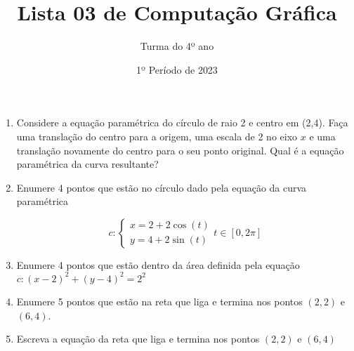 \documentclass[12pt]{article}
\title{Lista 03 de Computação Gráfica}
\date{1º Período de 2023}
\author{Turma do 4º ano}
\begin{document}
\maketitle

\begin{enumerate}


\item Considere a equação paramétrica do círculo de raio 2 e centro em (2,4).
Faça uma translação do centro para a origem, uma escala de 2 no eixo $x$ e uma translação novamente do centro para o seu ponto original.
Qual é a equação paramétrica da curva resultante?


\item Enumere 4 pontos que estão no círculo dado pela equação da curva paramétrica

\[c:
\begin{cases}
	x=2+2\cos(t)\\
	y=4+2\sin(t)
\end{cases}
t\in \left[0, 2\pi\right]
\]


\item Enumere 4 pontos que estão dentro da área definida pela equação $c: (x-2)^2 + (y-4)^2 = 2^2$


\item Enumere 5 pontos que estão na reta que liga e termina nos pontos $(2, 2)$ e $(6, 4)$.


\item Escreva a equação da reta que liga e termina nos pontos $(2, 2)$ e $(6, 4)$






\end{enumerate}
\end{document}
